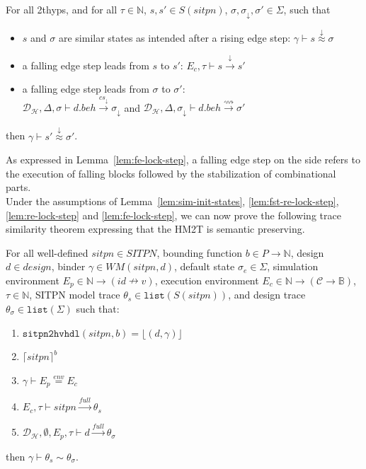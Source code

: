 \begin{lemma}
  \label{lem:fe-lock-step}
  For all \hm2thyps{}, and for all $\tau\in\mathbb{N}$,
  $s,s'\in{}S(sitpn)$, $\sigma,\sigma_\downarrow,\sigma'\in\Sigma$,
  such that
  \begin{itemize}
  \item $s$ and $\sigma$ are similar states as intended after a rising
    edge step: $\gamma\vdash{}s\stackrel{\downarrow}{\approx}\sigma$
  \item a falling edge step leads from $s$ to $s'$:
    $E_c,\tau\vdash{}s\xrightarrow{\downarrow}s'$
  \item a falling edge step leads from $\sigma$ to $\sigma'$:\\
    $\mathcal{D}_\mathcal{H},\Delta,\sigma\vdash{}d.beh\xrightarrow{cs_{\downarrow}}\sigma_{\downarrow}$
    and
    $\mathcal{D}_\mathcal{H},\Delta,\sigma_{\downarrow}\vdash{}d.beh\xrightarrow{\rightsquigarrow}\sigma'$
  \end{itemize}
  then $\gamma\vdash{}s'\stackrel{\downarrow}{\approx}{}\sigma'$.
\end{lemma}

As expressed in Lemma~\ref{lem:fe-lock-step}, a falling edge step on
the \hvhdl{} side refers to the execution of falling blocks followed
by the stabilization of combinational parts.\\

Under the assumptions of Lemma~\ref{lem:sim-init-states},
\ref{lem:fst-re-lock-step}, \ref{lem:re-lock-step} and
\ref{lem:fe-lock-step}, we can now prove the following trace
similarity theorem expressing that the HM2T is semantic preserving.

\begin{theorem}
  \label{thm:full-trace-sim}
  For all well-defined $sitpn\in{}SITPN$, bounding function
  $b\in{}P\rightarrow\mathbb{N}$, \hvhdl{} design $d\in{}design$,
  binder $\gamma\in{}WM(sitpn,d)$, default state $\sigma_e\in\Sigma$,
  simulation environment
  $E_p\in\mathbb{N}\rightarrow{}(id\nrightarrow{}v)$, execution
  environment
  $E_c\in\mathbb{N}\rightarrow(\mathcal{C}\rightarrow\mathbb{B})$,
  $\tau\in\mathbb{N}$, SITPN model trace
  $\theta_s\in\mathtt{list}(S(sitpn))$, and \hvhdl{} design trace
  $\theta_\sigma\in\mathtt{list}(\Sigma)$ such that:
  \begin{enumerate}
  \item $\mathtt{sitpn2hvhdl}(sitpn, b)=\lfloor(d,\gamma)\rfloor$
  \item $\lceil{}sitpn\rceil^b$
  \item $\gamma\vdash{}E_p\stackrel{env}{=}E_c$
  \item $E_c,\tau\vdash{}sitpn\xrightarrow{full}\theta_s$
  \item
    $\mathcal{D}_\mathcal{H},\emptyset,E_p,\tau\vdash{}d\xrightarrow{full}\theta_\sigma$
  \end{enumerate}
  then $\gamma\vdash\theta_s\sim\theta_\sigma$.
\end{theorem}


